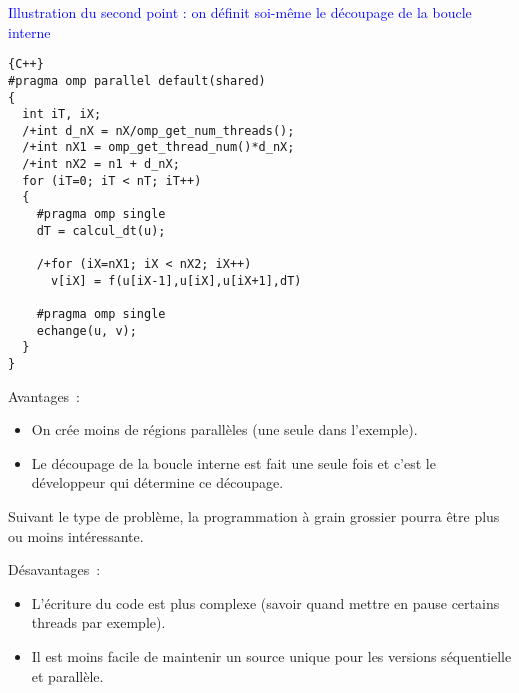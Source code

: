 \documentclass{beamer}
\begin{document}
\begin{frame}[fragile]
	\textcolor{blue}{Illustration du second point : on définit soi-même le découpage de la boucle interne}
	
	
	\begin{lstlisting}{C++}
#pragma omp parallel default(shared)
{
  int iT, iX;
  /+int d_nX = nX/omp_get_num_threads();
  /+int nX1 = omp_get_thread_num()*d_nX;
  /+int nX2 = n1 + d_nX;
  for (iT=0; iT < nT; iT++)
  {
    #pragma omp single
    dT = calcul_dt(u);

    /+for (iX=nX1; iX < nX2; iX++)
      v[iX] = f(u[iX-1],u[iX],u[iX+1],dT)
	
    #pragma omp single
    echange(u, v);
  }
}
	\end{lstlisting}
	
	\vfill
\end{frame}

\begin{frame}
    \vfill
	Avantages~:
	\begin{itemize}
		\item On crée moins de régions parallèles (une seule dans l'exemple).
		\item Le découpage de la boucle interne est fait une seule fois et c'est le développeur qui détermine ce découpage.
	\end{itemize}

    \vfill
    Suivant le type de problème, la programmation à grain grossier pourra être plus ou moins intéressante.
    
    \vfill
	Désavantages~:
    \begin{itemize}
    	\item L'écriture du code est plus complexe (savoir quand mettre en pause certains threads par exemple).
    	\item Il est moins facile de maintenir un source unique pour les versions séquentielle et parallèle.
   \end{itemize} 
    \vfill
    
\end{frame}
\end{document}
